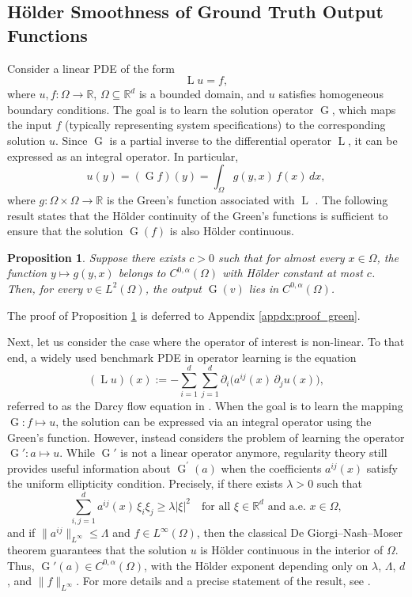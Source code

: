 \documentclass[11pt]{article}
\theoremstyle{plain}
\newtheorem{proposition}{Proposition}
\begin{document}
\subsection{H{\" o}lder Smoothness of Ground Truth Output Functions}
Consider a linear PDE of the form
\[
\operatorname{L} u = f,
\]
where $ u, f : \Omega \to \mathbb{R} $, $ \Omega \subseteq \mathbb{R}^d $ is a bounded domain, and $ u $ satisfies homogeneous boundary conditions. The goal is to learn the solution operator $ \operatorname{G} $, which maps the input $ f $ (typically representing system specifications) to the corresponding solution $ u $. Since $ \operatorname{G} $ is  a partial inverse to the differential operator $ \operatorname{L} $, it can be expressed as an integral operator. In particular,
\[
u(y) = (\operatorname{G}f)(y) = \int_{\Omega} g(y,x)\, f(x)\, dx,
\]
where $ g : \Omega \times \Omega \to \mathbb{R} $ is the Green’s function associated with $ \operatorname{L} $ \citep[Chapter 1]{hartmann2012green}. The following result states that the Hölder continuity of the Green's functions is sufficient to ensure that the solution $\operatorname{G}(f)$ is also Hölder continuous. 

\begin{proposition}\label{prop:green}
Suppose there exists $ c > 0 $ such that for almost every $ x \in \Omega $, the function $ y \mapsto g(y,x) $ belongs to $ C^{0,\alpha}(\Omega) $ with Hölder constant at most $ c $. Then, for every $ v \in L^2(\Omega) $, the output $ \operatorname{G}(v) $ lies in $ C^{0,\alpha}(\Omega) $.

\end{proposition}
\noindent The proof of Proposition \ref{prop:green} is deferred to Appendix \ref{appdx:proof_green}.   

Next, let us consider the case where the operator of interest is non-linear. To that end, a widely used benchmark PDE in operator learning is the equation
\[
(\operatorname{L}u)(x) := -\sum_{i=1}^d \sum_{j=1}^d \partial_i\big(a^{ij}(x) \, \partial_j u(x)\big),
\]
referred to as the Darcy flow equation in \cite{li2020fourier}. When the goal is to learn the mapping $ \operatorname{G}: f \mapsto u $, the solution can be expressed via an integral operator using the Green’s function. However, \cite{li2020fourier} instead considers the problem of learning the operator $ \operatorname{G}': a \mapsto u $. While $ \operatorname{G}' $ is not a linear operator anymore, regularity theory still provides useful information about $\operatorname{G}^{\prime}(a)$ when the coefficients $ a^{ij}(x) $ satisfy the uniform ellipticity condition. Precisely, if there exists $ \lambda > 0 $ such that
\[
\sum_{i,j=1}^d a^{ij}(x)\, \xi_i \xi_j \geq \lambda |\xi|^2 \quad \text{for all } \xi \in \mathbb{R}^d \text{ and a.e. } x \in \Omega,
\]
and if $ \|a^{ij}\|_{L^\infty} \leq \Lambda $ and $ f \in L^\infty(\Omega) $, then the classical De Giorgi–Nash–Moser theorem guarantees that the solution $ u $ is H{\" o}lder continuous in the interior of $ \Omega $. Thus, $ \operatorname{G}'(a) \in C^{0,\alpha}(\Omega) $, with the Hölder exponent depending only on $ \lambda $, $ \Lambda $, $ d $, and $ \|f\|_{L^\infty} $. For more details and a precise statement of the result, see \citep[Section 8.9]{gilbarg1977elliptic}.
\end{document}
